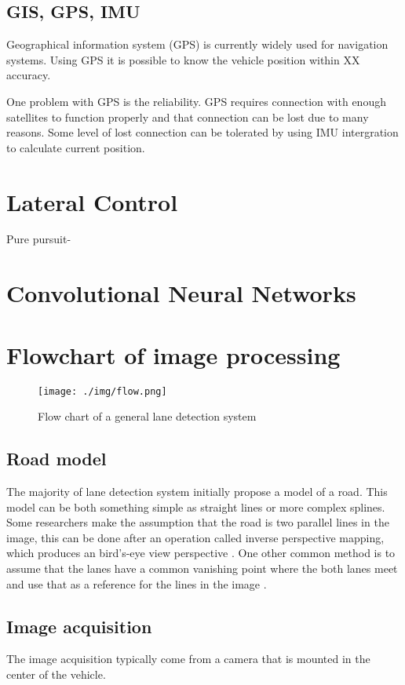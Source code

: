 \subsection{GIS, GPS, IMU}
Geographical information system (GPS) is currently widely used for navigation systems. Using GPS it is possible to know the vehicle position within XX accuracy. 

One problem with GPS is the reliability. GPS requires connection with enough satellites to function properly and that connection can be lost due to many reasons. Some level of lost connection can be tolerated by using IMU intergration to calculate current position. 



\section{Lateral Control}
Pure pursuit-
\section{Convolutional Neural Networks}


\section{Flowchart of image processing}

\begin{figure}[H]
  \texttt{[image: ./img/flow.png]}
  \centering
  \caption{Flow chart of a general lane detection system}
  \label{fig:Software architecture of the EMC2 platform}
\end{figure}


\subsection{Road model}
The majority of lane detection system initially propose a model of a road. This model can be both something simple as straight lines or more complex splines. Some researchers make the assumption that the road is two parallel lines in the image, this can be done after an operation called inverse perspective mapping, which produces an bird's-eye view  perspective \cite{bertozzi1998gold}. One other common method is to assume that the lanes have a common vanishing point where the both lanes meet and use that as a reference for the lines in the image \cite{Yenikaya:2013:KVR:2522968.2522970}\cite{jingyu2013lane}.
\subsection{Image acquisition}
The image acquisition typically come from a camera that is mounted in the center of the vehicle.
